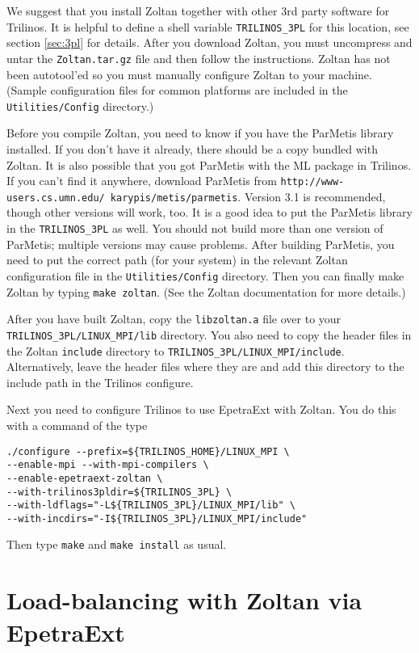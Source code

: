 We suggest that you install Zoltan together with other 3rd party software 
for Trilinos. It is helpful to define a shell variable \verb!TRILINOS_3PL! 
for this location, see section \ref{sec:3pl} for details. After 
you download Zoltan, you must uncompress and untar the
\verb!Zoltan.tar.gz! file and then follow the instructions. 
Zoltan has not been autotool'ed so you must manually configure
Zoltan to your machine. (Sample configuration files for common
platforms are included in the \verb!Utilities/Config! directory.) 

Before you compile Zoltan, you need to know if you have the ParMetis 
library installed.
If you don't have it already, there should be a copy bundled
with Zoltan. It is also possible that you got ParMetis with
the ML package in Trilinos. If you can't find it anywhere, 
download ParMetis from \texttt{http://www-users.cs.umn.edu/~karypis/metis/parmetis}. Version 3.1 is recommended, though other versions will work, too.
It is a good idea to put the ParMetis library in the \verb!TRILINOS_3PL!
as well. You should not build more than one version of ParMetis; multiple versions may cause problems. After building ParMetis, you need to put
the correct path (for your system) in the relevant Zoltan configuration file
in the \verb!Utilities/Config! directory. Then you can finally make Zoltan
by typing \verb!make zoltan!. (See the Zoltan documentation for more details.)

After you have built Zoltan, copy the \verb!libzoltan.a! file over to
your \verb!TRILINOS_3PL/LINUX_MPI/lib! directory. You also
need to copy the header files in the Zoltan \verb!include! directory
to \verb!TRILINOS_3PL/LINUX_MPI/include!. 
Alternatively, leave the header files where they are and add this
directory to the include path in the Trilinos configure.

Next you need to configure Trilinos to use EpetraExt with Zoltan.
You do this with a command of the type
\begin{verbatim}
./configure --prefix=${TRILINOS_HOME}/LINUX_MPI \
--enable-mpi --with-mpi-compilers \
--enable-epetraext-zoltan \
--with-trilinos3pldir=${TRILINOS_3PL} \
--with-ldflags="-L${TRILINOS_3PL}/LINUX_MPI/lib" \
--with-incdirs="-I${TRILINOS_3PL}/LINUX_MPI/include"
\end{verbatim}

Then type \verb!make! and \verb!make install! as usual.

\section{Load-balancing with Zoltan via EpetraExt}

